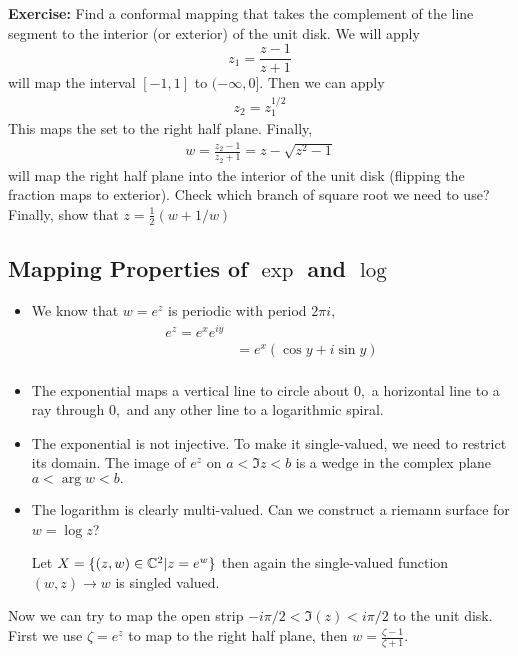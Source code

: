 \documentclass[a4paper,12pt]{article}
\begin{document}
\textbf{Exercise:} Find a conformal mapping that takes the complement of the line segment to the interior (or exterior) of the unit disk. We will apply \begin{equation}
    z_1=\frac{z-1}{z+1}
\end{equation}
will map the interval $[-1,1]$ to $(-\infty,0].$ Then we can apply \begin{align}
    z_2=z_1^{1/2}
\end{align}
This maps the set to the right half plane. Finally, \begin{align}
    w=\frac{z_2-1}{z_2+1}=z-\sqrt{z^2-1}
\end{align}
will map the right half plane into the interior of the unit disk (flipping the fraction maps to exterior). Check which branch of square root we need to use? Finally, show that $z=\frac{1}{2}(w+1/w)$

\subsection{Mapping Properties of $\exp$ and $\log$}
\begin{itemize}
    \item We know that $w=e^z$ is periodic with period $2\pi i,$\begin{align}
        e^z=e^xe^{iy}\\
        &=e^x(\cos y+i\sin y)\\
    \end{align}
    \item The exponential maps a vertical line to circle about $0,$ a horizontal line to a ray through $0,$ and any other line to a logarithmic spiral.
    \item The exponential is not injective. To make it single-valued, we need to restrict its domain. The image of $e^z$ on $a<\Im z<b$ is a wedge in the complex plane $a<\arg w<b.$
    \item The logarithm is clearly multi-valued. Can we construct a riemann surface for $w=\log z$?
    Let $X=\{(z,w)\in\mathbb{C}^2|z=e^w\}$ then again the single-valued function $(w,z)\to w$ is singled valued.
\end{itemize}
Now we can try to map the open strip $-i\pi/2<\Im(z)<i\pi/2$ to the unit disk. First we use $\zeta=e^z$ to map to the right half plane, then $w=\frac{\zeta-1}{\zeta+1}.$
\end{document}
